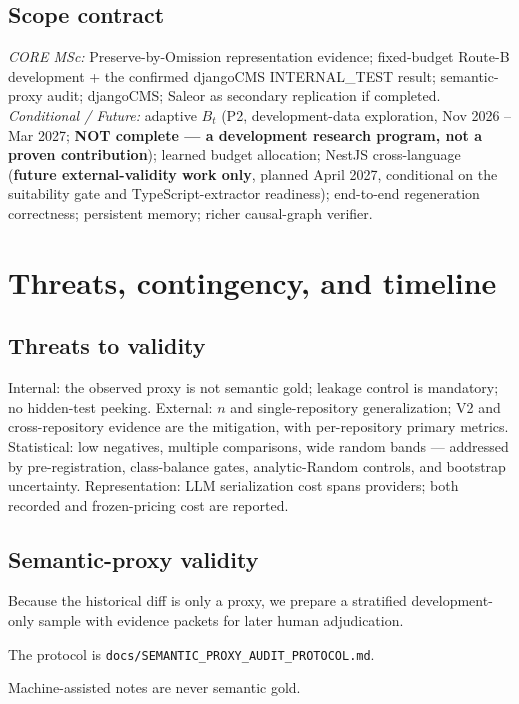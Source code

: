 \documentclass[11pt,a4paper]{article}
\begin{document}
\subsection{Scope contract}
\emph{CORE MSc:} Preserve-by-Omission representation evidence; fixed-budget
Route-B development + the confirmed djangoCMS INTERNAL\_TEST result;
semantic-proxy audit; djangoCMS; Saleor as secondary replication if completed.
\emph{Conditional / Future:} adaptive $B_t$ (P2, development-data exploration,
Nov 2026 -- Mar 2027; \textbf{NOT complete --- a development research program,
not a proven contribution}); learned budget allocation; NestJS cross-language
(\textbf{future external-validity work only}, planned April 2027, conditional
on the suitability gate and TypeScript-extractor readiness);
end-to-end regeneration correctness; persistent memory; richer causal-graph
verifier.

\section{Threats, contingency, and timeline}
\label{sec:threats}

\subsection{Threats to validity}
Internal: the observed proxy is not semantic gold; leakage control is mandatory;
no hidden-test peeking. External: $n$ and single-repository generalization; V2
and cross-repository evidence are the mitigation, with per-repository primary
metrics. Statistical: low negatives, multiple comparisons, wide random bands ---
addressed by pre-registration, class-balance gates, analytic-Random controls,
and bootstrap uncertainty. Representation: LLM serialization cost spans
providers; both recorded and frozen-pricing cost are reported.

\subsection{Semantic-proxy validity}
Because the historical diff is only a proxy, we prepare a stratified
development-only sample with evidence packets for later human adjudication.
\begin{sloppypar}
The protocol is
\texttt{docs/SEMANTIC\_PROXY\_AUDIT\_PROTOCOL.md}.
\end{sloppypar}
Machine-assisted notes are never semantic gold.
\end{document}
